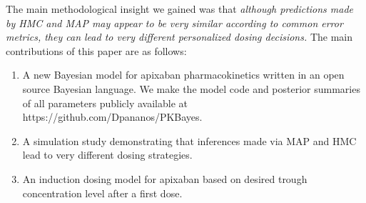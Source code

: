The main methodological insight we gained was that \textit{although predictions made by HMC and MAP may appear to be very similar according to common error metrics, they can lead to very different personalized dosing decisions.} The main contributions of this paper are as follows: 

\begin{enumerate}
\item A new Bayesian model for apixaban pharmacokinetics written in an open source Bayesian language.  We make the model code and posterior summaries of all parameters publicly available at https://github.com/Dpananos/PKBayes.

\item A simulation study demonstrating that inferences made via MAP and HMC lead to very different dosing strategies.

\item An induction dosing model for apixaban based on desired trough concentration level after a first dose.
\end{enumerate}




